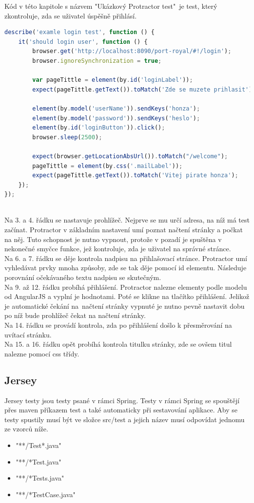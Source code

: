\documentclass[czech,master,public,dept460,male,cpdeclaration,twoside]{diploma}
\begin{document}
Kód v této kapitole s názvem "Ukázkový Protractor test"~je  test, který zkontroluje, zda se uživatel úspěšně přihlásí.
\\
\begin{lstlisting}[language=JavaScript, caption=Ukázkový Protractor test]
describe('examle login test', function () {
    it('should login user', function () {
        browser.get('http://localhost:8090/port-royal/#!/login');
        browser.ignoreSynchronization = true;

        var pageTittle = element(by.id('loginLabel'));
        expect(pageTittle.getText()).toMatch('Zde se muzete prihlasit');

        element(by.model('userName')).sendKeys('honza');
        element(by.model('password')).sendKeys('heslo');
        element(by.id('loginButton')).click();
        browser.sleep(2500);

        expect(browser.getLocationAbsUrl()).toMatch("/welcome");
        pageTittle = element(by.css('.mailLabel'));
        expect(pageTittle.getText()).toMatch('Vitej pirate honza');
    });
});
\end{lstlisting}
~\\
Na 3. a 4. řádku se nastavuje prohlížeč. Nejprve se mu určí adresa, na níž má test začínat. Protractor v základním nastavení umí poznat načtení stránky a počkat na něj. Tuto schopnost je nutno vypnout, protože v pozadí je spuštěna v nekonečné smyčce funkce, jež kontroluje, zda je uživatel na správné stránce.\\
Na 6. a 7. řádku se děje kontrola nadpisu na přihlašovací stránce. Protractor umí vyhledávat prvky mnoha způsoby, zde se tak děje pomocí id elementu. Následuje porovnání očekávaného textu nadpisu se skutečným.\\
Na 9. až 12. řádku probíhá přihlášení. Protractor nalezne elementy podle modelu od AngularJS a vyplní je hodnotami. Poté se klikne na tlačítko přihlášení. Jelikož je automatické čekání na~načtení stránky vypnuté je nutno pevně nastavit dobu po níž bude prohlížeč čekat na načtení stránky.\\
Na 14. řádku se provádí kontrola, zda po přihlášení došlo k přesměrování na uvítací stránku.\\
Na 15. a 16. řádku opět probíhá kontrola titulku stránky, zde se ovšem titul nalezne pomocí css třídy.

\subsection{Jersey}
Jersey testy jsou testy psané v rámci Spring. Testy v rámci Spring se spouštějí přes maven příkazem test a také automaticky při sestavování aplikace. Aby se testy spustily musí být ve složce src/test a jejich název musí odpovídat jednomu ze vzorců níže.
\begin{itemize}
	\item "**/Test*.java"
	\item "**/*Test.java"
	\item "**/*Tests.java"
	\item "**/*TestCase.java"
\end{itemize}
\end{document}
